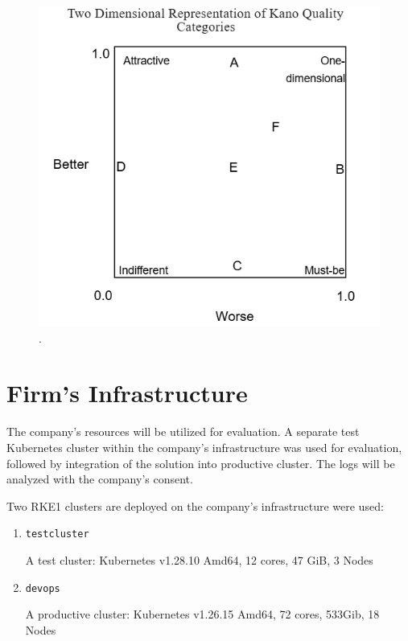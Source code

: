\documentclass[../main.tex]{subfiles}
\begin{document}
\begin{figure}[H]
        \centering
        \includegraphics[]{img/3-background/kano/2dkano.png}
        \caption{ \cite{berger1993kano}.}
        \label{fig:2dkano}
\end{figure}

\section{Firm's Infrastructure}

The company's resources will be utilized for evaluation. A separate test Kubernetes cluster within the company's infrastructure was used for evaluation, followed by integration of the solution into productive cluster.
The logs will be analyzed with the company's consent.

Two RKE1 clusters are deployed on the company's infrastructure were used:

\begin{enumerate}
    \item[] \texttt{testcluster} 
    
    A test cluster: Kubernetes v1.28.10 Amd64, 12 cores, 47 GiB, 3 Nodes
    \item[] \texttt{devops} 
    
    A productive cluster: Kubernetes v1.26.15 Amd64, 72 cores, 533Gib, 18 Nodes
\end{enumerate}
\end{document}

